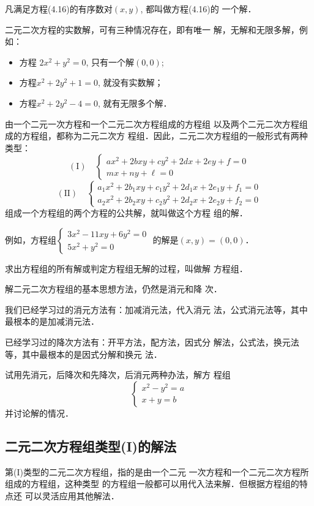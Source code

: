 凡满足方程(4.16)的有序数对$(x,y)$, 都叫做方程(4.16)的
一个解．

二元二次方程的实数解，可有三种情况存在，即有唯一
解，无解和无限多解，例如：
\begin{itemize}
    \item 方程 $2x^2+y^2=0$, 只有一个解$(0,0)$;
    \item 方程$x^2+2y^2+1=0$, 就没有实数解；
    \item 方程$x^2+2y^2-4=0$, 就有无限多个解．
\end{itemize}

由一个二元一次方程和一个二元二次方程组成的方程组
以及两个二元二次方程组成的方程组，都称为二元二次方
程组．因此，二元二次方程组的一般形式有两种类型：
\[(\text{I})\quad \begin{cases}
    ax^2+2bxy+cy^2+2dx+2ey+f=0\\
mx+ny+\ell=0
\end{cases}\]
\[(\text{II})\quad \begin{cases}
    a_1x^2+2b_1xy+c_1y^2+2d_1x+2e_1y+f_1=0\\
    a_2x^2+2b_2xy+c_2y^2+2d_2x+2e_2y+f_2=0
\end{cases}\]
组成一个方程组的两个方程的公共解，就叫做这个方程
组的解．

例如，方程组$\begin{cases}
 3x^2-11xy+6y^2=0\\
5x^2+y^2=0   
\end{cases}$
的解是$(x,y)=(0,0)$．
    
求出方程组的所有解或判定方程组无解的过程，叫做解
方程组．

解二元二次方程组的基本思想方法，仍然是消元和降
次．

我们已经学习过的消元方法有：加减消元法，代入消元
法，公式消元法等，其中最根本的是加减消元法．

已经学习过的降次方法有：开平方法，配方法，因式分
解法，公式法，换元法等，其中最根本的是因式分解和换元
法．

\begin{ex}
    试用先消元，后降次和先降次，后消元两种办法，解方
程组$$\begin{cases}
  x^2-y^2=a\\
x+y=b  
\end{cases}$$
并讨论解的情况．
\end{ex}

\subsection{二元二次方程组类型(I)的解法}
第(I)类型的二元二次方程组，指的是由一个二元
一次方程和一个二元二次方程所组成的方程组，这种类型
的方程组一般都可以用代入法来解．但根据方程组的特点还
可以灵活应用其他解法．


